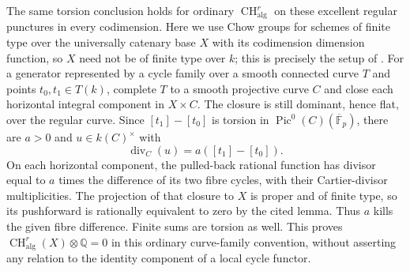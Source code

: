 The same torsion conclusion holds for ordinary
$\operatorname{CH}^r_{\mathrm{alg}}$ on these
excellent regular punctures in every codimension.
Here we use Chow groups for schemes of finite
type over the universally catenary base $X$
with its codimension dimension function, so
$X$ need not be of finite type over $k$;
this is precisely the setup of
\citet[Situation 42.7.1 and Lemma 42.20.3]{D_StacksChowProper}.
For a generator represented by a cycle family
over a smooth connected curve $T$ and points
$t_0,t_1\in T(k)$, complete $T$ to a smooth
projective curve $C$ and close each horizontal
integral component in $X\times C$. The closure
is still dominant, hence flat, over the regular
curve. Since $[t_1]-[t_0]$ is torsion in
$\operatorname{Pic}^0(C)(\overline{\mathbb F}_p)$,
there are $a>0$ and $u\in k(C)^\times$ with
\[
                 \operatorname{div}_C(u)
                         =a([t_1]-[t_0]).
\]
On each horizontal component, the pulled-back
rational function has divisor equal to $a$
times the difference of its two fibre cycles,
with their Cartier-divisor multiplicities.
The projection of that closure to $X$ is
proper and of finite type, so its pushforward
is rationally equivalent to zero by the cited
lemma. Thus $a$ kills the given fibre difference.
Finite sums are torsion as well. This proves
$\operatorname{CH}^r_{\mathrm{alg}}(X)\otimes\mathbb Q=0$
in this ordinary curve-family convention,
without asserting any relation to the
identity component of a local cycle functor.
